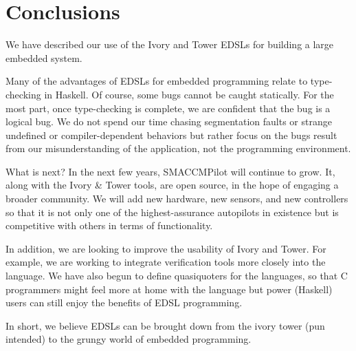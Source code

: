 \section{Conclusions}
\label{sec:conclusions}

We have described our use of the Ivory and Tower EDSLs for building a large
embedded system. 

Many of the advantages of EDSLs for embedded programming relate to type-checking
in Haskell.  Of course, some bugs cannot be caught statically.  For the most part,
once type-checking is complete, we are confident that the bug is a logical bug.
We do not spend our time chasing segmentation faults or strange undefined or
compiler-dependent behaviors but rather focus on the bugs result from our
misunderstanding of the application, not the programming environment.

What is next?  In the next few years, SMACCMPilot will continue to grow. It,
along with the Ivory \& Tower tools, are open source, in the hope of engaging a
broader community.
We will add new hardware, new sensors, and new controllers so that it is not
only one of the highest-assurance autopilots in existence but is competitive
with others in terms of functionality.

In addition, we are looking to improve the usability of Ivory and Tower.  For
example, we are working to integrate verification tools more closely into the
language.  We have also begun to define quasiquoters for the languages, so that
C programmers might feel more at home with the language but power (Haskell)
users can still enjoy the benefits of EDSL programming.

In short, we believe EDSLs can be brought down from the ivory tower (pun
intended) to the grungy world of embedded programming.







